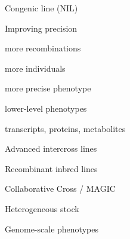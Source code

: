 \documentclass[12pt,t]{beamer}
\begin{document}
\begin{frame}[c]{Congenic line (NIL)}


\end{frame}



\begin{frame}[c]{Improving precision}

  \vspace{-20mm}

  \bbi
\item more recombinations
\item more individuals
\item more precise phenotype
\item lower-level phenotypes
\bi
\item transcripts, proteins, metabolites
  \ei
  \ei

\end{frame}



\begin{frame}[c]{Advanced intercross lines}


\end{frame}


\begin{frame}[c]{Recombinant inbred lines}


\end{frame}


\begin{frame}[c]{Collaborative Cross / MAGIC}


\end{frame}





\begin{frame}[c]{Heterogeneous stock}

  \vspace{2mm}


\end{frame}


\begin{frame}[c]{Genome-scale phenotypes}
\end{frame}
\end{document}
